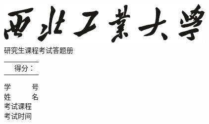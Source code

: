 \begin{titlepage}
	\vspace{43.2pt}
	
	
	\begin{center}
		\includegraphics[scale=1.5]{pic/university_text_logo}\\
		\vspace{9pt}
		\sXiaoyi 研究生课程考试答题册
	\end{center}
	
	\vspace{43.2pt}
	
	
	
	\begin{table}[h]
		\begin{tabular}{p{8cm}|p{44mm}|}
			\cline{2-2}
			& \vspace{6pt}
			\sSihao \fKai 得分： 
			\vspace{12pt}
			\\ \cline{2-2}
			
		\end{tabular}
	\end{table}
	
	\vspace{14.4pt}
	
	\begin{center}
		\vskip 2cm
		{
			\sSihao 学~~~~~~号 \coverunderline[5.5cm]{}\\
			\vskip 0.7cm
			\sSihao 姓~~~~~~名 \coverunderline[5.5cm]{}\\
			\vskip 0.7cm
			\sSihao 考试课程 \\
			\vskip 0.7cm
			\sSihao 考试时间 
		}
	\end{center}
\end{titlepage}